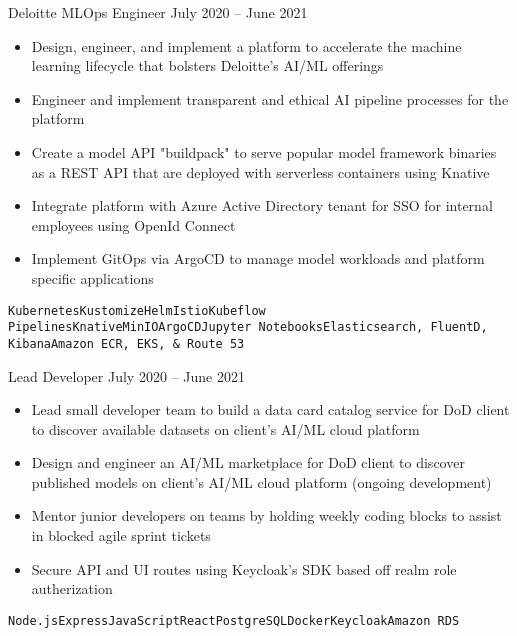 \documentclass[9pt]{resume} %
\begin{document}
\begin{minipage}[t]{0.6\textwidth}
	\begin{entrylist}{Deloitte}
		\entry
			{MLOps Engineer}
			{July 2020 -- June 2021}
			{\begin{itemize}[noitemsep,topsep=0pt,leftmargin=*]
			        \item Design, engineer, and implement a platform to accelerate the machine learning lifecycle that bolsters Deloitte’s AI/ML offerings
			        \item  Engineer and implement transparent and ethical AI pipeline processes for the platform
				\item Create a model API "buildpack" to serve popular model framework binaries as a REST API that are deployed with serverless containers using Knative
				\item Integrate platform with Azure Active Directory tenant for SSO for internal employees using OpenId Connect
				\item Implement GitOps via ArgoCD to manage model workloads and platform specific applications
			\end{itemize}
			{\addtolength{\leftskip}{3mm}\texttt{Kubernetes}\slashsep\texttt{Kustomize}\slashsep\texttt{Helm}\slashsep\texttt{Istio}\slashsep\texttt{Kubeflow Pipelines}\slashsep\texttt{Knative}\slashsep\texttt{MinIO}\slashsep\texttt{ArgoCD}\slashsep\texttt{Jupyter Notebooks}\slashsep\texttt{Elasticsearch, FluentD, Kibana}\slashsep\texttt{Amazon ECR, EKS, \& Route 53}\par}}
			
		\entry
			{Lead Developer}
			{July 2020 -- June 2021}
			{\begin{itemize}[noitemsep,topsep=0pt,leftmargin=*]
				\item Lead small developer team to build a data card catalog service for DoD client to discover available datasets on client's AI/ML cloud platform
  				\item Design and engineer an AI/ML marketplace for DoD client to discover published models on client's AI/ML cloud platform (ongoing development)
				\item Mentor junior developers on teams by holding weekly coding blocks to assist in blocked agile sprint tickets
				\item Secure API and UI routes using Keycloak's SDK based off realm role autherization
			\end{itemize}
			{\addtolength{\leftskip}{3mm}\texttt{Node.js}\slashsep\texttt{Express}\slashsep\texttt{JavaScript}\slashsep\texttt{React}\slashsep\texttt{PostgreSQL}\slashsep\texttt{Docker}\slashsep\texttt{Keycloak}\slashsep\texttt{Amazon RDS}\par}}
				       

\end{entrylist}
\end{minipage}
\end{document}
